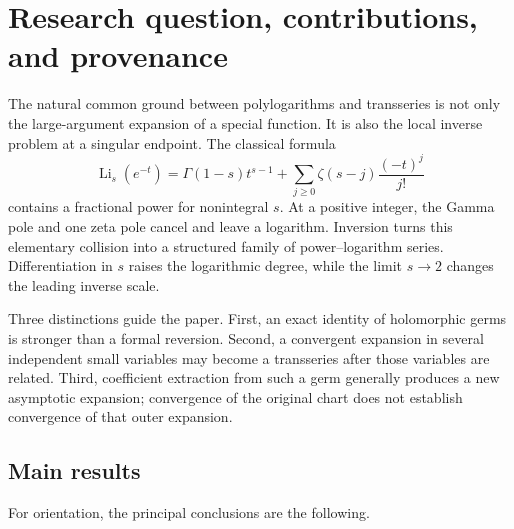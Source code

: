 \documentclass[11pt,a4paper]{article}
\numberwithin{equation}{section}
\theoremstyle{definition}
\theoremstyle{remark}
\DeclareMathOperator{\Li}{Li}
\begin{document}
\section{Research question, contributions, and provenance}
\label{sec:intro}

The natural common ground between polylogarithms and transseries is not
only the large-argument expansion of a special function.  It is also the
local inverse problem at a singular endpoint.  The classical formula
\[
 \Li_s(e^{-t})
 =\Gamma(1-s)t^{s-1}
   +\sum_{j\ge0}\zeta(s-j)\frac{(-t)^j}{j!}
\]
contains a fractional power for nonintegral \(s\).  At a positive integer,
the Gamma pole and one zeta pole cancel and leave a logarithm.
Inversion turns this elementary collision into a structured family of
power--logarithm series.  Differentiation in \(s\) raises the logarithmic
degree, while the limit \(s\to2\) changes the leading inverse scale.

Three distinctions guide the paper.  First, an exact identity of
holomorphic germs is stronger than a formal reversion.  Second, a
convergent expansion in several independent small variables may become
a transseries after those variables are related.  Third, coefficient
extraction from such a germ generally produces a new asymptotic
expansion; convergence of the original chart does not establish
convergence of that outer expansion.

\subsection{Main results}

For orientation, the principal conclusions are the following.
\end{document}
